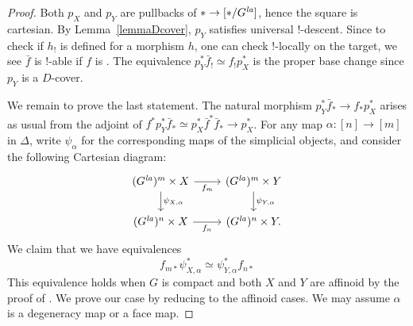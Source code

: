 \documentclass[a4paper,10pt]{amsart}
\theoremstyle{remark}
\theoremstyle{definition}
\theoremstyle{plain}
\numberwithin{equation}{section}
\newcommand{\la}{{\it la}}
\begin{document}
\begin{proof}
	Both $p_X$ and $p_Y$ are pullbacks of $*\rightarrow [*/G^{\la}]$, hence the square is cartesian. By Lemma~\ref{lemmaDcover}, $p_Y$ satisfies universal $!$-descent. Since to check if $h_!$ is defined for a morphism $h$, one can check $!$-locally on the target, we see $\bar f$ is $!$-able if $f$ is \cite[Thm.~3.4.11]{heyer20246functor}. The equivalence $p_Y^*\bar f_!\simeq f_!p_X^*$ is the proper base change \cite[Prop.~3.1.8]{heyer20246functor} since $p_{Y}$ is a $D$-cover.

	We remain to prove the last statement. The natural morphism $p_Y^*\bar f_*\to f_*p_X^* $ arises as usual from the adjoint of $f^*p_{Y}^*\bar f_*\simeq p_X^{*}\bar f^*\bar f_*\rightarrow p_{X}^*$. For any map $\alpha:[n]\rightarrow [m]$ in $\Delta$, write $\psi_{\alpha}$ for the corresponding maps of the simplicial objects, and consider the following Cartesian diagram:
	\begin{equation}\label{equationdiagramsimplicalXY}
		\begin{tikzcd}
			(G^{\la})^m\times X \ar[d, "\psi_{X,\alpha}"] \ar[r, "f_m"'] & (G^{\la})^m\times Y \ar[d, "\psi_{Y,\alpha}"] \\
			(G^{\la})^n\times X\ar[r, "f_n"'] & (G^{\la})^n\times Y.
		\end{tikzcd}
	\end{equation}
	We claim that we have equivalences 
	\begin{equation}\label{equationequivalencebasechangefmnstarphi}
		f_{m*}\psi_{X,\alpha}^*\simeq \psi_{Y,\alpha}^*f_{n*}
	\end{equation} 
	This equivalence holds when $G$ is compact and both $X$ and $Y$ are affinoid by the proof of \cite[Cor.~2.42]{mikami2026finiteness}. We prove our case by reducing to the affinoid cases. We may assume $\alpha$ is a degeneracy map or a face map. 
	

\end{proof}
\end{document}
